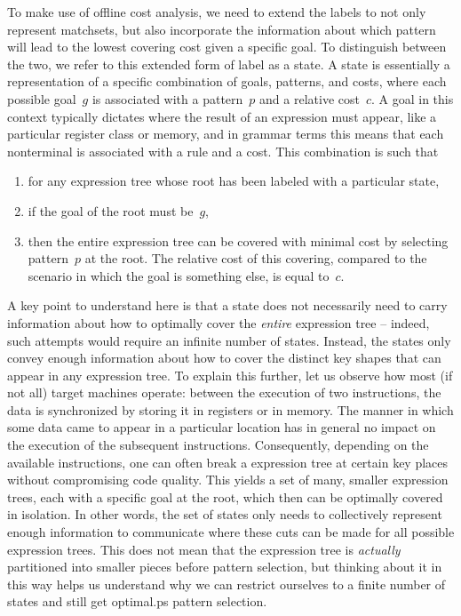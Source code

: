 {To make use of \gls{offline cost analysis}, we need to extend the labels to not
only represent \glspl{matchset}, but also incorporate the information about
which \gls{pattern} will lead to the lowest covering cost given a specific
goal.
%
To distinguish between the two, we refer to this extended form of label as
a \gls{state}.
%
A \gls{state} is essentially a representation of a specific
combination of goals, \glspl{pattern}, and costs, where each possible goal~$g$
is associated with a \gls{pattern}~$p$ and a relative cost~$c$.
%
A goal in this
context typically dictates where the result of an expression must appear, like a
particular \gls{register class} or memory, and in \gls{grammar} terms this means
that each \gls{nonterminal} is associated with a \gls{rule} and a cost.
%
This
combination is such that
\begin{enumerate}
  \item for any \gls{expression tree} whose \gls{root} has been labeled with a
    particular \gls{state},
  \item if the goal of the \gls{root} must be~$g$,
  \item then the entire \gls{expression tree} can be covered with minimal cost by
    selecting \gls{pattern}~$p$ at the \gls{root}.
%
The relative cost of this
    covering, compared to the scenario in which the goal is something else, is
    equal to~$c$.
\end{enumerate}

A key point to understand here is that a \gls{state} does not necessarily need
to carry information about how to optimally cover the \emph{entire} \gls{expression tree} -- indeed, such attempts would require an infinite number of
\glspl{state}.
%
Instead, the \glspl{state} only convey enough information about
how to cover the distinct key shapes that can appear in any \gls{expression tree}.
%
To explain this further, let us observe how most (if not all)
\glspl{target machine} operate: between the execution of two
\glspl{instruction}, the data is synchronized by storing it in \glspl{register}
or in memory.
%
The manner in which some data came to appear in a particular
location has in general no impact on the execution of the subsequent
\glspl{instruction}.
%
Consequently, depending on the available
\glspl{instruction}, one can often break a \gls{expression tree} at certain key
places without compromising code quality.
%
This yields a set of many, smaller
\glspl{expression tree}, each with a specific goal at the \gls{root}, which then
can be optimally covered in isolation.
%
In other words, the set of \glspl{state}
only needs to collectively represent enough information to communicate where
these cuts can be made for all possible \glspl{expression tree}.
%
This does not mean
that the \gls{expression tree} is \emph{actually} partitioned into smaller pieces
before \gls{pattern selection}, but thinking about it in this way helps us
understand why we can restrict ourselves to a finite number of \glspl{state} and
still get \gls{optimal.ps} \gls{pattern selection}.

}
